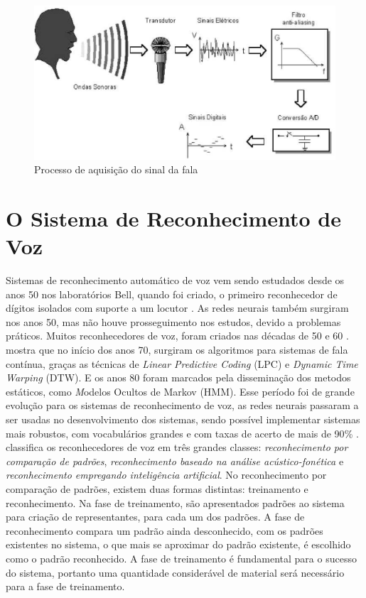 \begin{figure}
\includegraphics[width=1\textwidth]{graficos/aquisicao_fala.eps}
\caption{Processo de aquisição do sinal da fala}
\end{figure}


\section{O Sistema de Reconhecimento de Voz}\label{sec:red_khn}

Sistemas de reconhecimento automático de voz vem sendo estudados desde os anos 50 nos laboratórios Bell, quando foi criado, o primeiro reconhecedor de dígitos isolados com suporte a um locutor \cite{MetodosProAnderson}. As redes neurais também surgiram nos anos 50, mas não houve prosseguimento nos estudos, devido a problemas práticos. Muitos reconhecedores de voz, foram criados nas décadas de 50 e 60 \cite{RavSpeechSadaoki}.  mostra que no início dos anos 70, surgiram os algoritmos para sistemas de fala contínua, graças as técnicas de \textit{Linear Predictive Coding} (LPC) e \textit{Dynamic Time Warping} (DTW). E os anos 80 foram marcados pela disseminação dos metodos estáticos, como \textit Modelos Ocultos de Markov (HMM). Esse período foi de grande evolução para os sistemas de reconhecimento de voz, as redes neurais passaram a ser usadas no desenvolvimento dos sistemas, sendo possível implementar sistemas mais robustos, com vocabulários grandes e com taxas de acerto de mais de 90{\%} \cite{AvaliaTecJose}.
 classifica os reconhecedores de voz em três grandes classes: \textit{reconhecimento por comparação de padrões}, \textit{reconhecimento baseado na análise acústico-fonética} e \textit{reconhecimento empregando inteligência artificial}. No reconhecimento por comparação de padrões, existem duas formas distintas: treinamento e reconhecimento. Na fase de treinamento, são apresentados padrões ao sistema para criação de representantes, para cada um dos padrões. A fase de reconhecimento compara um padrão ainda desconhecido, com os padrões existentes no sistema, o que mais se aproximar do padrão existente, é escolhido como o padrão reconhecido. A fase de treinamento é fundamental para o sucesso do sistema, portanto uma quantidade considerável de material será necessário para a fase de treinamento. 

